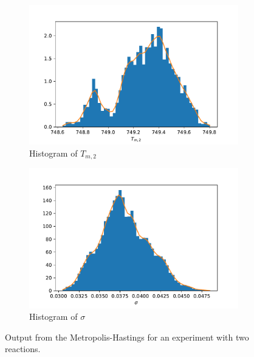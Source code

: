 \begin{figure}[h!]
\begin{subfigure}{0.5\textwidth}
\includegraphics[width=\linewidth]{figures/bayesian/2_reactions/mass/hist_Tm2.pdf}
\caption{Histogram of $T_{m,2}$}
\label{HistTm2}
\end{subfigure}%
\newline
\begin{subfigure}{0.5\textwidth}
\centering
\includegraphics[width=\linewidth]{figures/bayesian/2_reactions/mass/hist_sigma.pdf}
\caption{Histogram of $\sigma$}
\label{Histsigma2}
\end{subfigure}%
\caption{Output from the Metropolis-Hastings for an experiment with two reactions.}
\label{fig:MH3}
\end{figure}

